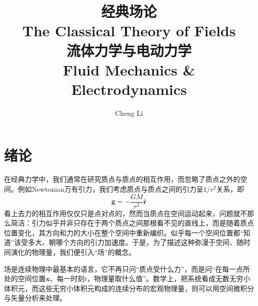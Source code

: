 \documentclass[b5paper]{book}
\author{Cheng Li}
\title{\textbf{{\Huge 经典场论}\\{\Huge The Classical Theory of Fields}}\\\normalsize 流体力学与电动力学\\Fluid Mechanics \& Electrodynamics}
\begin{document}
\maketitle
\tableofcontents


\chapter*{绪论}
在经典力学中，我们通常在研究质点与质点的相互作用，而忽略了质点之外的空间。例如Newtonian万有引力，我们考虑质点与质点之间的引力呈$1/r^2$关系，即
\begin{equation}
    \boldsymbol{g} = -\frac{GM}{r^2}\hat{\boldsymbol{r}}
\end{equation}
看上去力的相互作用仅仅只是点对点的，然而当质点在空间运动起来，问题就不那么简洁：引力似乎并非只存在于两个质点之间那根看不见的直线上，而是随着质点位置变化，其方向和力的大小在整个空间中重新编织。似乎每一个空间位置都“知道”该受多大、朝哪个方向的引力加速度。于是，为了描述这种弥漫于空间、随时间演化的物理量，我们便引入“场”的概念。

场是连续物理中最基本的语言，它不再只问“质点受什么力”，而是问“在每一点所处的空间位置$\boldsymbol{x}$、每一时刻$t$，物理量取什么值”。数学上，把系统看成无数无穷小体积元，而这些无穷小体积元构成的连续分布的宏观物理量，则可以用空间微积分与矢量分析来处理。
\end{document}
